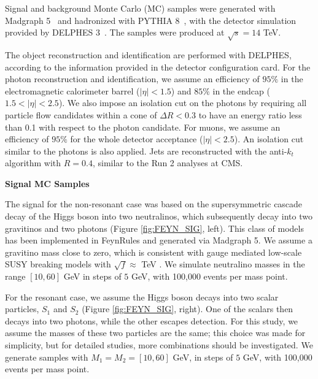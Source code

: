Signal and background Monte Carlo (MC) samples were generated with Madgraph 5~\cite{madgraph} and hadronized with PYTHIA 8~\cite{pythia}, with the detector simulation provided by DELPHES 3~\cite{delphes}.
The samples were produced at $\sqrt{s} = 14$ TeV.

The object reconstruction and identification are performed with DELPHES, according to the information provided in the detector configuration card. For the photon reconstruction and identification, we assume an efficiency of $95\%$ in the electromagnetic calorimeter barrel ($|\eta| < 1.5$) and $85\%$ in the endcap ($1.5 < |\eta| < 2.5$). We also impose an isolation cut on the photons by requiring all particle flow candidates within a cone of $\Delta R < 0.3$ to have an energy ratio less than 0.1 with respect to the photon candidate. For muons, we assume an efficiency of $95\%$ for the whole detector acceptance ($|\eta| < 2.5$). An isolation cut similar to the photons is also applied. Jets are reconstructed with the anti-$k_t$ algorithm with $R = 0.4$, similar to the Run 2 analyses at CMS.

\vspace{0.2cm} \textbf{Signal MC Samples}

The signal for the non-resonant case was based on the supersymmetric cascade decay of the Higgs boson into two neutralinos, which subsequently decay into two gravitinos and two photons (Figure \ref{fig:FEYN_SIG}, left). This class of models has been implemented in FeynRules \cite{Christensen:2013aua} and generated via Madgraph 5. We assume a gravitino mass close to zero, which is consistent with gauge mediated low-scale SUSY breaking models with $\sqrt{f} \approx$ TeV \cite{Petersson:2012dp}. We simulate neutralino masses in the range $[10,60]$ GeV in steps of $5$ GeV, with 100,000 events per mass point.

For the resonant case, we assume the Higgs boson decays into two scalar particles, $S_1$ and $S_2$ (Figure \ref{fig:FEYN_SIG}, right). One of the scalars then decays into two photons, while the other escapes detection. For this study, we assume the masses of these two particles are the same; this choice was made for simplicity, but for detailed studies, more combinations should be investigated. We generate samples with $M_{1} = M_{2} = [10,60]$ GeV, in steps of $5$ GeV, with 100,000 events per mass point.

